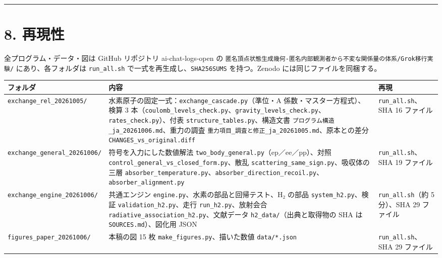 \documentclass[
  a4paper,
]{ltjsarticle}
\newcounter{none} %
\begin{document}
\begin{center}\rule{0.5\linewidth}{0.5pt}\end{center}

\section{8. 再現性}\label{ux518dux73feux6027}

全プログラム・データ・図は GitHub リポジトリ ai-chat-logs-open の
\texttt{匿名頂点状態生成幾何-匿名内部観測者から不変な関係量の体系/Grok移行実験/}
にあり、各フォルダは \texttt{run\_all.sh}
で一式を再生成し、\texttt{SHA256SUMS} を持つ。Zenodo
には同じファイルを同梱する。

{\def\LTcaptype{none} %
\begin{longtable}[]{@{}
  >{\raggedright\arraybackslash}p{}
  >{\raggedright\arraybackslash}p{}
  >{\raggedright\arraybackslash}p{}@{}}
\toprule\noalign{}
\begin{minipage}[b]{\linewidth}\raggedright
フォルダ
\end{minipage} & \begin{minipage}[b]{\linewidth}\raggedright
内容
\end{minipage} & \begin{minipage}[b]{\linewidth}\raggedright
再現
\end{minipage} \\
\midrule\noalign{}
\endhead
\bottomrule\noalign{}
\endlastfoot
\texttt{exchange\_rel\_20261005/} &
水素原子の固定一式：\texttt{exchange\_cascade.py}（準位・A
係数・マスター方程式）、検算 3
本（\texttt{coulomb\_levels\_check.py}、\texttt{gravity\_levels\_check.py}、\texttt{rates\_check.py}）、付表
\texttt{structure\_tables.py}、構造文書
\texttt{プログラム構造\_ja\_20261006.md}、重力の調査
\texttt{重力項目\_調査と修正\_ja\_20261005.md}、原本との差分
\texttt{CHANGES\_vs\_original.diff} & \texttt{run\_all.sh}、SHA 16
ファイル \\
\texttt{exchange\_general\_20261006/} & 符号を入力にした数値解法
\texttt{two\_body\_general.py}（ep／ee／pp）、対照
\texttt{control\_general\_vs\_closed\_form.py}、散乱
\texttt{scattering\_same\_sign.py}、吸収体の三層
\texttt{absorber\_temperature.py}、\texttt{absorber\_direction\_recoil.py}、\texttt{absorber\_alignment.py}
& \texttt{run\_all.sh}、SHA 19 ファイル \\
\texttt{exchange\_engine\_20261006/} & 共通エンジン
\texttt{engine.py}、水素の部品と回帰テスト、H₂ の部品
\texttt{system\_h2.py}、検証 \texttt{validation\_h2.py}、走行
\texttt{run\_h2.py}、放射会合
\texttt{radiative\_association\_h2.py}、文献データ
\texttt{h2\_data/}（出典と取得物の SHA は \texttt{SOURCES.md}）、図化用
JSON & \texttt{run\_all.sh}（約 5 分）、SHA 29 ファイル \\
\texttt{figures\_paper\_20261006/} & 本稿の図 15 枚
\texttt{make\_figures.py}、描いた数値 \texttt{data/*.json} &
\texttt{run\_all.sh}、SHA 29 ファイル \\
\end{longtable}
}
\end{document}
